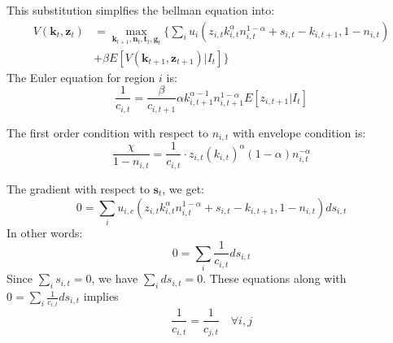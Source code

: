 \documentclass{article}
\begin{document}
This substitution simplfies the bellman equation into:
\begin{align*}
    V(\mathbf{k}_t, \mathbf{z}_t) &= \max_{\mathbf{k}_{t+1}, \mathbf{n}_{t}, \mathbf{t}_{t}, \mathbf{g}_{t}} \{ \sum_{i} u_{i}\left(z_{i,t} k_{i,t}^\alpha n_{i,t}^{1-\alpha} + s_{i, t} - k_{i, t+1}, 1 - n_{i,t}\right) \\
    &+ \beta E[V(\mathbf{k}_{t+1}, \mathbf{z}_{t+1}) | I_t] \}
\end{align*}
The Euler equation for region \(i\) is:
\begin{equation}
    \frac{1}{c_{i, t}} =  \frac{\beta}{c_{i, t+1}} \alpha k_{i, t+1}^{\alpha - 1} n_{i, t+1}^{1-\alpha} E\left[z_{i, t+1} | I_t\right]
\end{equation}

The first order condition with respect to \(n_{i, t}\) with envelope condition is:
\begin{equation}
    \frac{\chi}{1-n_{i,t}} = \frac{1}{c_{i,t}} \cdot z_{i,t} (k_{i,t})^{\alpha}(1-\alpha)n_{i,t}^{-\alpha}
\end{equation}

The gradient with respect to \(\mathbf{s}_t\), we get:
\begin{equation}
    0 = \sum_{i} u_{i, c}\left(z_{i,t} k_{i,t}^\alpha n_{i, t}^{1-\alpha} +s_{i, t} - k_{i, t+1}, 1 - n_{i, t}\right) ds_{i, t}
\end{equation}
In other words:
\begin{equation}
    0 = \sum_{i} \frac{1}{c_{i,t}} ds_{i, t}
\end{equation}
Since \( \sum_{i} s_{i,t} = 0 \), we have \( \sum_{i} ds_{i, t} = 0 \). These equations along with \( 0 = \sum_{i} \frac{1}{c_{i,t}} ds_{i, t} \) implies
\begin{equation}
    \frac{1}{c_{i,t}} = \frac{1}{c_{j,t}} \quad \forall i, j
\end{equation}
\end{document}
